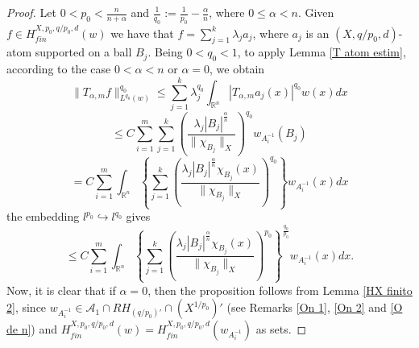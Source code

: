 \documentclass[oneside,10pt]{article}
\begin{document}
\begin{proof}
Let $0 < p_0 < \frac{n}{n+ \alpha}$ and $\frac{1}{q_0} := \frac{1}{p_0} - \frac{\alpha}{n}$, where $0 \leq \alpha < n$. Given 
$f \in H^{X, p_0, q/p_0, d}_{fin}(w)$ we have that $f = \sum_{j=1}^{k} \lambda_j a_j$, where $a_j$ is an $(X, q/p_0, d)$-atom supported 
on a ball $B_j$. Being $0 < q_0 < 1$, to apply Lemma \ref{T atom estim}, according to the case $0 < \alpha < n$ or $\alpha = 0$, we obtain
\[
\| T_{\alpha, m} f \|_{L^{q_0}(w)}^{q_0} \leq \sum_{j=1}^{k} \lambda_{j}^{q_0} \int_{\mathbb{R}^{n}} |T_{\alpha, m}a_j(x)|^{q_0} w(x) dx
\]
\[
\leq C \sum_{i=1}^{m} \sum_{j=1}^{k} \left(\frac{\lambda_{j}  |B_j|^{\frac{\alpha}{n}}}{\| \chi_{B_j} \|_{X}}\right)^{q_0} 
w_{A_{i}^{-1}}(B_j)
\]
\[
= C \sum_{i=1}^{m} \int_{\mathbb{R}^{n}} \left\{ \sum_{j=1}^{k} \left(\frac{\lambda_{j}  |B_j|^{\frac{\alpha}{n}} \chi_{B_j}(x)}{\| \chi_{B_j} \|_{X}}\right)^{q_0} \right\} w_{A_{i}^{-1}}(x) dx
\]
the embedding $l^{p_0} \hookrightarrow l^{q_0}$ gives
\begin{equation}
\leq C \sum_{i=1}^{m} \int_{\mathbb{R}^{n}} \left\{\sum_{j=1}^{k} \left(\frac{\lambda_{j}  |B_j|^{\frac{\alpha}{n}} \chi_{B_j}(x)}{\| \chi_{B_j} \|_{X}}\right)^{p_0} \right\}^{\frac{q_0}{p_0}} w_{A_{i}^{-1}}(x) dx \label{desig}.
\end{equation}
Now, it is clear that if $\alpha=0$, then the proposition follows from Lemma \ref{HX finito 2}, since 
$w_{A^{-1}_i} \in \mathcal{A}_1 \cap RH_{(q/p_0)'} \cap (X^{1/p_0})'$ (see Remarks \ref{On 1}, \ref{On 2} and \ref{O de n}) and 
$H^{X, p_0, q/p_0, d}_{fin}(w) = H^{X, p_0, q/p_0, d}_{fin}(w_{A_i^{-1}})$ as sets. 


\end{proof}
\end{document}
